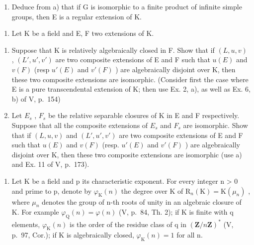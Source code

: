 \begin{enumerate}
\def\labelenumi{\alph{enumi})}
\setcounter{enumi}{1}
\tightlist
\item
  Deduce from a) that if G is isomorphic to a finite product of infinite simple groups, then E is a regular extension of K.
\end{enumerate}

\begin{enumerate}
\def\labelenumi{\arabic{enumi})}
\setcounter{enumi}{3}
\tightlist
\item
  Let K be a field and E, F two extensions of K.
\end{enumerate}

\begin{enumerate}
\def\labelenumi{\alph{enumi})}
\item
  Suppose that K is relatively algebraically closed in F. Show that if \((L, u, v)\) , \((L', u', v')\) are two composite extensions of E and F such that \(u(E)\) and \(v(F)\) (resp \(u'(E)\) and \(v'(F)\) ) are algebraically disjoint over K, then these two composite extensions are isomorphic. (Consider first the case where E is a pure transcendental extension of K; then use Ex. 2, a), as well as Ex. 6, b) of V, p.~154)
\item
  Let \(E_{s}\) , \(F_{s}\) be the relative separable closures of K in E and F respectively. Suppose that all the composite extensions of \(E_{s}\) and \(F_{s}\) are isomorphic. Show that if \((L, u, v)\) and \((L', u', v')\) are two composite extensions of E and F such that \(u(E)\) and \(v(F)\) (resp. \(u'(E)\) and \(v'(F)\) ) are algebraically disjoint over K, then these two composite extensions are isomorphic (use a) and Ex. 11 of V, p.~173).
\end{enumerate}

\begin{enumerate}
\def\labelenumi{\arabic{enumi})}
\setcounter{enumi}{4}
\tightlist
\item
  Let K be a field and p its characteristic exponent. For every integer n \textgreater{} 0 and prime to p, denote by \(\varphi_{\mathrm{K}}(n)\) the degree over K of \(\mathrm{R}_{n}(\mathrm{K}) = \mathrm{K}(\mu_{n})\) , where \(\mu_{n}\) denotes the group of n-th roots of unity in an algebraic closure of K. For example \(\varphi_{\mathrm{Q}}(n) = \varphi(n)\) (V, p.~84, Th. 2); if K is finite with q elements, \(\varphi_{\mathrm{K}}(n)\) is the order of the residue class of q in \((\mathbf{Z}/n\mathbf{Z})^{*}\) (V, p.~97, Cor.); if K is algebraically closed, \(\varphi_{\mathrm{K}}(n) = 1\) for all n.
\end{enumerate}

